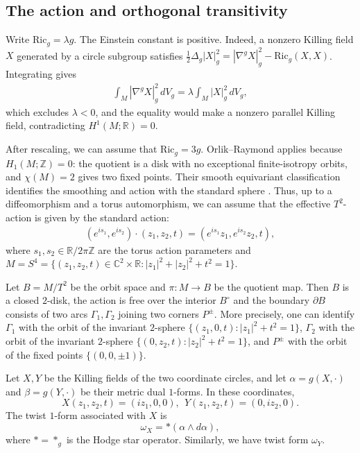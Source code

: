 \documentclass[letterpaper]{amsart}
\theoremstyle{definition}
\theoremstyle{remark}
\begin{document}
\subsection{The action and orthogonal transitivity}\label{subsec-orthogonal}
Write $\mathrm{Ric}_g=\lambda g$. The Einstein constant is positive.
Indeed, a nonzero Killing field $X$ generated by a circle subgroup satisfies $\frac12\Delta_g|X|_g^2=|\nabla^gX|_g^2-\mathrm{Ric}_g(X,X)$. Integrating gives
\begin{align*}
	\int_{M}|\nabla^g X|_g^2\,dV_g = \lambda \int_{M} |X|_g^2\,dV_g ,
\end{align*} 
which excludes $\lambda <0$, and the equality would make a nonzero parallel Killing field, contradicting $H^1(M; \mathbb{R}) =0$.

After rescaling, we can assume that $\mathrm{Ric}_g = 3 g$. Orlik--Raymond applies because $H_1(M;\mathbb Z)=0$: the quotient is a disk with no exceptional finite-isotropy orbits, and $\chi(M)=2$ gives two fixed points. Their smooth equivariant classification identifies the smoothing and action with the standard sphere \cite[\S\S4.2, 5.1--5.4]{notes-OrlikRaymond}. Thus, up to a diffeomorphism and a torus automorphism, we can assume that the effective $T^2$-action is given by the standard action:
\begin{align*}
	\left( e ^{i s_1}, e ^{i s_2} \right) \cdot  \left( z_1, z_2, t \right) = \left( e ^{i s_1} z_1, e ^{i s_2}z_2, t \right) ,
\end{align*} 
where $s_1,s_2\in\mathbb R/2\pi\mathbb Z$ are the torus action parameters and $M=S^4 = \{ (z_1, z_2, t) \in \mathbb{C}^2 \times \mathbb{R}: |z_1|^2+ |z_2|^2+ t ^2 =1\} $.

Let $B = M / T^2$ be the orbit space and $\pi : M \to B$ be the quotient map. Then $B$ is a closed $2$-disk, the action is free over the interior  $B ^{\circ}$ and the boundary $\partial B$ consists of two arcs $\Gamma _1, \Gamma _2$ joining two corners $P ^{\pm}$. More precisely, one can identify $\Gamma _1$ with the orbit of the invariant $2$-sphere $\{(z_1, 0, t): |z_1|^2 + t ^2= 1\}$, $\Gamma _2$ with the orbit of the invariant $2$-sphere $\{(0, z_2, t): |z_2|^2+ t ^2=1\}$, and $P ^{\pm}$ with the orbit of the fixed points $\{(0,0, \pm 1)\}$. 

Let $X, Y$ be the Killing fields of the two coordinate circles, and let $\alpha=g(X,\cdot)$ and $\beta=g(Y,\cdot)$ be their metric dual $1$-forms. In these coordinates, 
$$X(z_1, z_2, t) = (i z_1, 0, 0),\ \  Y(z_1, z_2, t) = (0, i z_2, 0).$$
The twist $1$-form associated with $X$ is 
$$\omega _{X} = * (\alpha \wedge d \alpha ),$$
where $*=*_g$ is the Hodge star operator.
Similarly, we have twist form $\omega _{Y}$.
\end{document}
